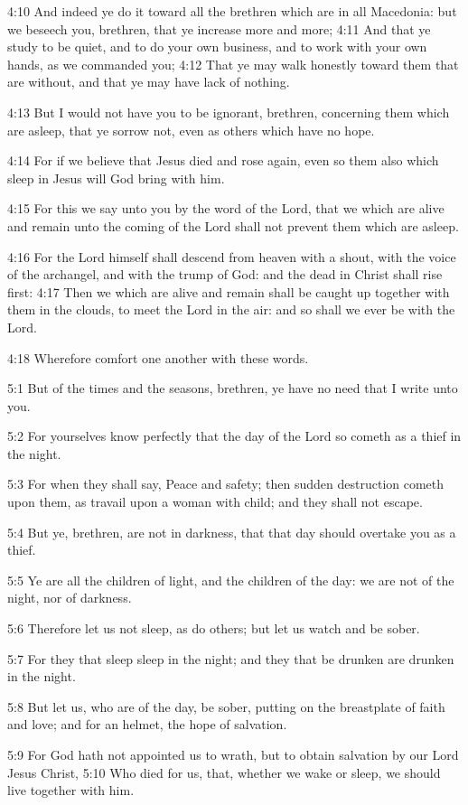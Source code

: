 4:10 And indeed ye do it toward all the brethren which are in all Macedonia: but we beseech you, brethren, that ye increase more and more; 4:11 And that ye study to be quiet, and to do your own business, and to work with your own hands, as we commanded you; 4:12 That ye may walk honestly toward them that are without, and that ye may have lack of nothing.

4:13 But I would not have you to be ignorant, brethren, concerning them which are asleep, that ye sorrow not, even as others which have no hope.

4:14 For if we believe that Jesus died and rose again, even so them also which sleep in Jesus will God bring with him.

4:15 For this we say unto you by the word of the Lord, that we which are alive and remain unto the coming of the Lord shall not prevent them which are asleep.

4:16 For the Lord himself shall descend from heaven with a shout, with the voice of the archangel, and with the trump of God: and the dead in Christ shall rise first: 4:17 Then we which are alive and remain shall be caught up together with them in the clouds, to meet the Lord in the air: and so shall we ever be with the Lord.

4:18 Wherefore comfort one another with these words.

5:1 But of the times and the seasons, brethren, ye have no need that I write unto you.

5:2 For yourselves know perfectly that the day of the Lord so cometh as a thief in the night.

5:3 For when they shall say, Peace and safety; then sudden destruction cometh upon them, as travail upon a woman with child; and they shall not escape.

5:4 But ye, brethren, are not in darkness, that that day should overtake you as a thief.

5:5 Ye are all the children of light, and the children of the day: we are not of the night, nor of darkness.

5:6 Therefore let us not sleep, as do others; but let us watch and be sober.

5:7 For they that sleep sleep in the night; and they that be drunken are drunken in the night.

5:8 But let us, who are of the day, be sober, putting on the breastplate of faith and love; and for an helmet, the hope of salvation.

5:9 For God hath not appointed us to wrath, but to obtain salvation by our Lord Jesus Christ, 5:10 Who died for us, that, whether we wake or sleep, we should live together with him.

